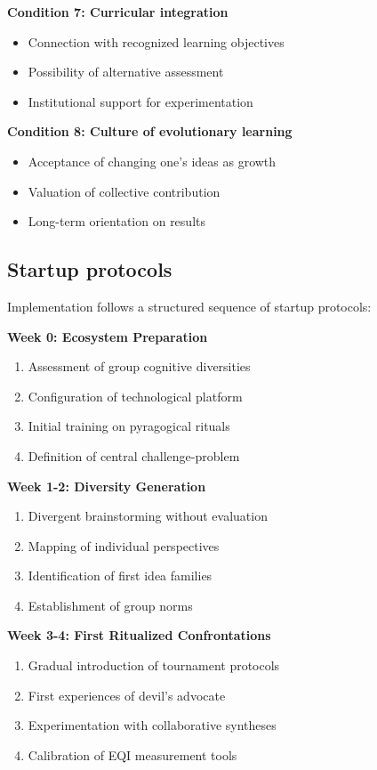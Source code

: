 \textbf{Condition 7: Curricular integration}
\begin{itemize}
	\item Connection with recognized learning objectives
	\item Possibility of alternative assessment
	\item Institutional support for experimentation
\end{itemize}

\textbf{Condition 8: Culture of evolutionary learning}
\begin{itemize}
	\item Acceptance of changing one's ideas as growth
	\item Valuation of collective contribution
	\item Long-term orientation on results
\end{itemize}

\subsection{Startup protocols}

Implementation follows a structured sequence of startup protocols:

\textbf{Week 0: Ecosystem Preparation}
\begin{enumerate}
	\item Assessment of group cognitive diversities
	\item Configuration of technological platform
	\item Initial training on pyragogical rituals
	\item Definition of central challenge-problem
\end{enumerate}

\textbf{Week 1-2: Diversity Generation}
\begin{enumerate}
	\item Divergent brainstorming without evaluation
	\item Mapping of individual perspectives
	\item Identification of first idea families
	\item Establishment of group norms
\end{enumerate}

\textbf{Week 3-4: First Ritualized Confrontations}
\begin{enumerate}
	\item Gradual introduction of tournament protocols
	\item First experiences of devil's advocate
	\item Experimentation with collaborative syntheses
	\item Calibration of EQI measurement tools
\end{enumerate}

